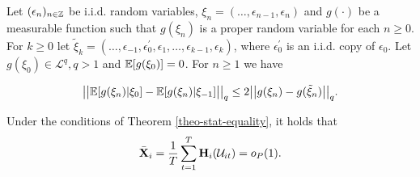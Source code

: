 \documentclass[a4paper,12pt]{article}
\begin{document}
\begin{propA}{\cite{Wu2007}}\label{prop-wu}
Let $(\epsilon_n)_{n\in\mathbb{Z}}$ be i.i.d. random variables, $\xi_n = (\ldots, \epsilon_{n-1}, \epsilon_n)$ and $g(\cdot)$ be a measurable function such that $g(\xi_n)$ is a proper random variable for each $n \geq 0$. For $k \geq 0$ let $\tilde{\xi}_k = (\ldots, \epsilon_{-1}, \epsilon_0^\prime, \epsilon_1, \ldots, \epsilon_{k-1}, \epsilon_k)$, where $\epsilon_0^\prime$ is an i.i.d. copy of $\epsilon_0$. Let $g(\xi_0) \in \mathcal{L}^q, q > 1$ and $\mathbb{E}[g(\xi_0)] = 0$. For $n \geq 1$ we have

$$\big|\big| \mathbb{E} [g(\xi_n)| \xi_0] - \mathbb{E} [g(\xi_n)| \xi_{-1}]\big|\big|_q \leq 2 \big|\big| g(\xi_n) - g(\tilde{\xi}_n)\big|\big|_q.$$
\end{propA}

\begin{propA}\label{propA-reg-5}
Under the conditions of Theorem \ref{theo-stat-equality}, it holds that 
\begin{align*}
\bar{\mathbf{X}}_i = \frac{1}{T}\sum_{t=1}^T \mathbf{H}_i (\mathcal{U}_{it}) = o_P(1).
\end{align*}
\end{propA}
\end{document}
